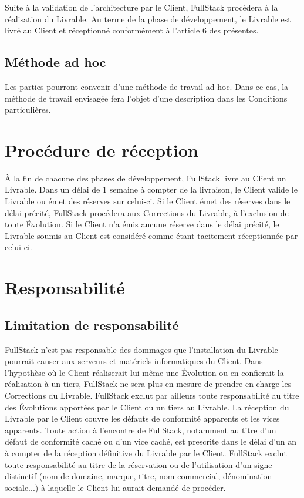 \documentclass[11pt]{article}
\begin{document}
Suite à la validation de l’architecture par le Client, FullStack procédera à la réalisation du Livrable. Au terme de la phase de développement, le Livrable est livré au Client et réceptionné conformément à l’article 6 des présentes.


\subsection{Méthode ad hoc}

Les parties pourront convenir d’une méthode de travail ad hoc. Dans ce cas, la méthode de travail envisagée fera l’objet d’une description dans les Conditions particulières.


\section{Procédure de réception}

À la fin de chacune des phases de développement, FullStack livre au Client un Livrable. Dans un délai de 1 semaine à compter de la livraison, le Client valide le Livrable ou émet des réserves sur celui-ci. Si le Client émet des réserves dans le délai précité, FullStack procédera aux Corrections du Livrable, à l’exclusion de toute Évolution. Si le Client n’a émis aucune réserve dans le délai précité, le Livrable soumis au Client est considéré comme étant tacitement réceptionnée par celui-ci.


\section{Responsabilité}

\subsection{Limitation de responsabilité}

FullStack n’est pas responsable des dommages que l’installation du Livrable pourrait causer aux serveurs et matériels informatiques du Client. Dans l’hypothèse où le Client réaliserait lui-même une Évolution ou en confierait la réalisation à un tiers, FullStack ne sera plus en mesure de prendre en charge les Corrections du Livrable. FullStack exclut par ailleurs toute responsabilité au titre des Évolutions apportées par le Client ou un tiers au Livrable. La réception du Livrable par le Client couvre les défauts de conformité apparents et les vices apparents. Toute action à l’encontre de FullStack, notamment au titre d’un défaut de conformité caché ou d’un vice caché, est prescrite dans le délai d’un an à compter de la réception définitive du Livrable par le Client. FullStack exclut toute responsabilité au titre de la réservation ou de l’utilisation d’un signe distinctif (nom de domaine, marque, titre, nom commercial, dénomination sociale...) à laquelle le Client lui aurait demandé de procéder.
\end{document}
